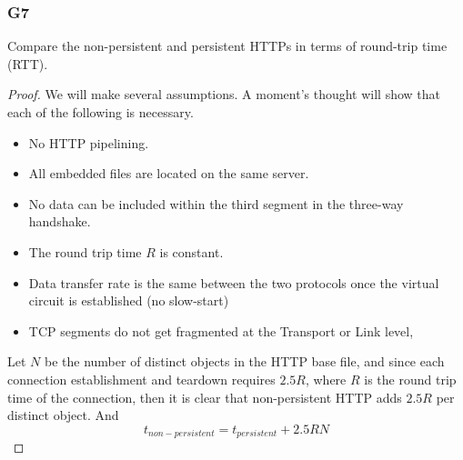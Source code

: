 \documentclass[../main.tex]{subfiles}
\begin{document}
\subsubsection*{G7}
\begin{wts}
    Compare the non-persistent and persistent HTTPs in terms of round-trip time (RTT).
\end{wts}
\begin{proof}
    We will make several assumptions. A moment's thought will show that each of the following is necessary.
    \begin{itemize}
        \item No HTTP pipelining.
        \item All embedded files are located on the same server.
        \item No data can be included within the third segment in the three-way handshake.
        \item The round trip time $R$ is constant.
        \item Data transfer rate is the same between the two protocols once the virtual circuit is established (no slow-start)
        \item TCP segments do not get fragmented at the Transport or Link level,
    \end{itemize}
    Let $N$ be the number of distinct objects in the HTTP base file, and since each connection establishment and teardown requires $2.5R$, where $R$ is the round trip time of the connection, then it is clear that non-persistent HTTP adds $2.5R$ per distinct object. And
    \[t_{non-persistent}=t_{persistent}+2.5RN\]
\end{proof}
\end{document}
